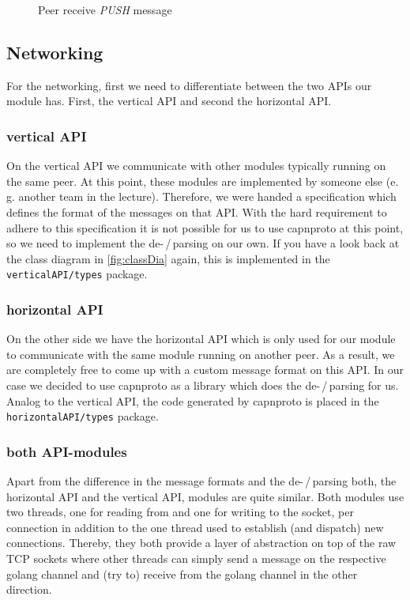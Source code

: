 \documentclass[a4paper,english,10pt,NET]{tumarticle}
\renewcommand{\eg}{\mbox{e.\,g.}\xspace} %
\begin{document}
\begin{figure}
	\centering
	
	\caption{Peer receive \textit{PUSH} message}
	\label{fig:msg-relay}
\end{figure}


\subsection{Networking} \label{sec:structureNetworking}

For the networking, first we need to differentiate between the two APIs our module has.
First, the vertical API and second the horizontal API.

\subsubsection{vertical API}
On the vertical API we communicate with other modules typically running on the same peer.
At this point, these modules are implemented by someone else (\eg another team in the lecture).
Therefore, we were handed a specification which defines the format of the messages on that API.
With the hard requirement to adhere to this specification it is not possible for us to use capnproto at this point, so we need to implement the de-\,/\,parsing on our own.
If you have a look back at the class diagram in \cref{fig:classDia} again, this is implemented in the \texttt{verticalAPI/types} package.

\subsubsection{horizontal API}
On the other side we have the horizontal API which is only used for our module to communicate with the same module running on another peer.
As a result, we are completely free to come up with a custom message format on this API.
In our case we decided to use capnproto as a library which does the de-\,/\,parsing for us.
Analog to the vertical API, the code generated by capnproto is placed in the \texttt{horizontalAPI/types} package.

\subsubsection{both API-modules}
Apart from the difference in the message formats and the de-\,/\,parsing both, the horizontal API and the vertical API, modules are quite similar.
Both modules use two threads, one for reading from and one for writing to the socket, per connection in addition to the one thread used to establish (and dispatch) new connections.
Thereby, they both provide a layer of abstraction on top of the raw TCP sockets where other threads can simply send a message on the respective golang channel and (try to) receive from the golang channel in the other direction.
\end{document}
